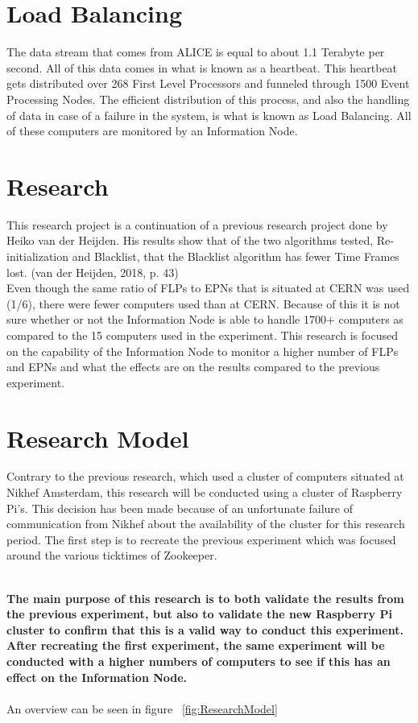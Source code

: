 \section{Load Balancing}
The data stream that comes from ALICE is equal to about 1.1 Terabyte per second. All of this data comes in what is known as a heartbeat. This heartbeat gets distributed over 268 First Level Processors and funneled through	1500 Event Processing Nodes. The efficient distribution of this process, and also the handling of data in case of a failure in the system, is what is known as Load Balancing. All of these computers are monitored by an Information Node.

\section{Research}
This research project is a continuation of a previous research project done by Heiko van der Heijden. His results show that of the two algorithms tested, Re-initialization and Blacklist, that the Blacklist algorithm has fewer Time Frames lost. (van der Heijden, 2018, p. 43)\\
Even though the same ratio of FLPs to EPNs that is situated at CERN was used (1/6), there were fewer computers used than at CERN. Because of this it is not sure whether or not the Information Node is able to handle 1700+ computers as compared to the 15 computers used in the experiment. This research is focused on the capability of the Information Node to monitor a higher number of FLPs and EPNs and what the effects are on the results compared to the previous experiment.

\section{Research Model}
Contrary to the previous research, which used a cluster of computers situated at Nikhef Amsterdam, this research will be conducted using a cluster of Raspberry Pi's. This decision has been made because of an unfortunate failure of communication from Nikhef about the availability of the cluster for this research period. The first step is to recreate the previous experiment which was focused around the various ticktimes of Zookeeper.
\newpage

~\\\textbf{The main purpose of this research is to both validate the results from the previous experiment, but also to validate the new Raspberry Pi cluster to confirm that this is a valid way to conduct this experiment. After recreating the first experiment, the same experiment will be conducted with a higher numbers of computers to see if this has an effect on the Information Node.} \\~\\
An overview can be seen in figure ~\ref{fig:ResearchModel}


